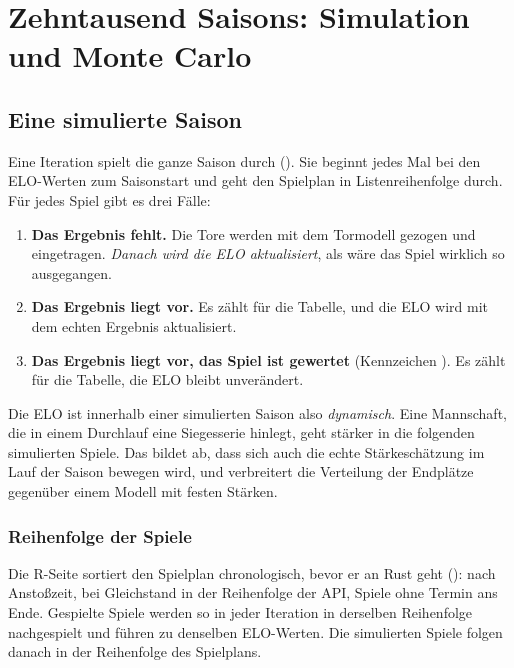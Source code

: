\chapter{Zehntausend Saisons: Simulation und Monte Carlo}\label{kap:simulation}

\section{Eine simulierte Saison}

Eine Iteration spielt die ganze Saison durch
(). Sie beginnt
jedes Mal bei den ELO-Werten zum Saisonstart und geht den Spielplan in
Listenreihenfolge durch. Für jedes Spiel gibt es drei Fälle:

\begin{enumerate}
  \item \textbf{Das Ergebnis fehlt.} Die Tore werden mit dem Tormodell
        gezogen und eingetragen. \emph{Danach wird die ELO aktualisiert}, als
        wäre das Spiel wirklich so ausgegangen.
  \item \textbf{Das Ergebnis liegt vor.} Es zählt für die Tabelle, und die ELO
        wird mit dem echten Ergebnis aktualisiert.
  \item \textbf{Das Ergebnis liegt vor, das Spiel ist gewertet} (Kennzeichen
        ). Es zählt für die Tabelle, die ELO bleibt
        unverändert.
\end{enumerate}

Die ELO ist innerhalb einer simulierten Saison also \emph{dynamisch}. Eine
Mannschaft, die in einem Durchlauf eine Siegesserie hinlegt, geht stärker in
die folgenden simulierten Spiele. Das bildet ab, dass sich auch die echte
Stärkeschätzung im Lauf der Saison bewegen wird, und verbreitert die
Verteilung der Endplätze gegenüber einem Modell mit festen Stärken.

\subsection*{Reihenfolge der Spiele}

Die R-Seite sortiert den Spielplan chronologisch, bevor er an Rust geht
(): nach Anstoßzeit, bei Gleichstand
in der Reihenfolge der API, Spiele ohne Termin ans Ende. Gespielte Spiele
werden so in jeder Iteration in derselben Reihenfolge nachgespielt und führen
zu denselben ELO-Werten. Die simulierten Spiele folgen danach in der Reihenfolge
des Spielplans.


